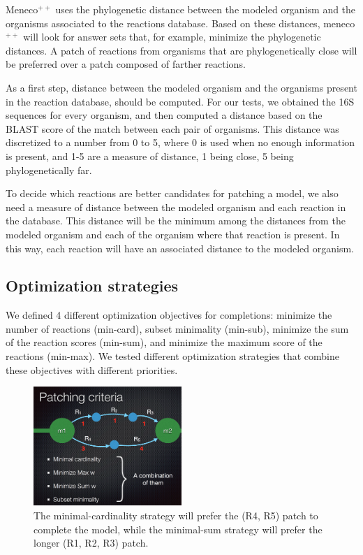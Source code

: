 \documentclass{article}
\newcommand{\Meneco}{Meneco$^{++}$\xspace}
\newcommand{\meneco}{meneco$^{++}$\xspace}
\begin{document}
\Meneco uses the phylogenetic distance between the modeled organism and the organisms associated to the reactions database. Based on these distances, \meneco will look for answer sets that, for example, minimize the phylogenetic distances. A patch of reactions from organisms that are phylogenetically close will be preferred over a patch composed of farther reactions.

As a first step, distance between the modeled organism and the organisms present in the reaction database, should be computed. For our tests, we obtained the 16S sequences for every organism, and then computed a distance based on the BLAST score of the match between each pair of organisms. This distance was discretized to a number from 0 to 5, where 0 is used when no enough information is present, and 1-5 are a measure of distance, 1 being close, 5 being phylogenetically far.

To decide which reactions are better candidates for patching a model, we also need a measure of distance between the modeled organism and each reaction in the database. This distance will be the minimum among the distances from the modeled organism and each of the organism where that reaction is present. In this way, each reaction will have an associated distance to the modeled organism.

\subsection{Optimization strategies}

We defined 4 different optimization objectives for completions: 
minimize the number of reactions (min-card),
subset minimality (min-sub), 
minimize the sum of the reaction scores (min-sum), and  
minimize the maximum score of the reactions (min-max).
We tested different optimization strategies that combine these objectives with different priorities.

\begin{figure}[tb]
	\begin{center}
		\includegraphics[width=0.5\textwidth]{patchingStrategies.png}
	\end{center}
	\caption[]{The minimal-cardinality strategy will prefer the (R4, R5) patch to complete the model, while the minimal-sum strategy will prefer the longer (R1, R2, R3) patch.}
	\label{fig:figure1}
\end{figure}
\end{document}
